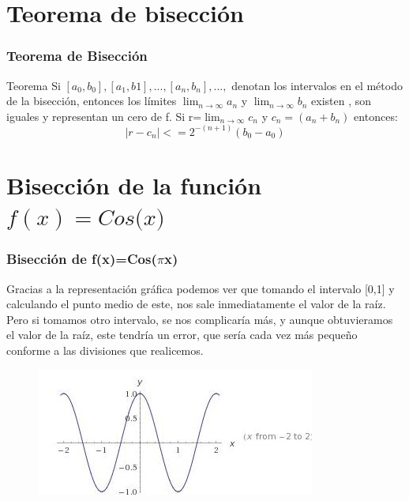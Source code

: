 \documentclass{beamer}
\begin{document}
\section{Teorema de bisección}

\begin{frame}
\frametitle{Teorema de Bisección}
\begin{block}{Teorema}
Si $[a_0, b_0],[a_1,b1],...,[a_n,b_n],...,$ denotan los intervalos en el método de la bisección, entonces los límites $\lim_{n\rightarrow \infty} a_n$ y $\lim_{n\rightarrow \infty}b_n $ existen , son iguales y representan un cero de f. Si r=$\lim_{n\rightarrow \infty}c_n$ y $c_n=(a_n+b_n)$ entonces: $$|r-c_n|<=2^{-(n+1)} (b_0 - a_0)$$
\end{block}

\end{frame}


\section{Bisección de la función $f(x)=Cos($\pi$x)$} 

\begin{frame}
\frametitle{Bisección de f(x)=Cos($\pi$x)}

\begin{block}{}
Gracias a la representación gráfica podemos ver que tomando el intervalo [0,1] y calculando el punto medio de este, nos sale inmediatamente el valor de la raíz. Pero si tomamos otro intervalo, se nos complicaría más, y aunque obtuvieramos el valor de la raíz, este tendría un error, que sería cada vez más pequeño conforme a las divisiones que realicemos.
\end{block}

\begin{figure}[b]
\begin{center}
\includegraphics[scale=0.8]{cos.jpeg}
\end{center}
\end{figure}

\end{frame}
\end{document}
